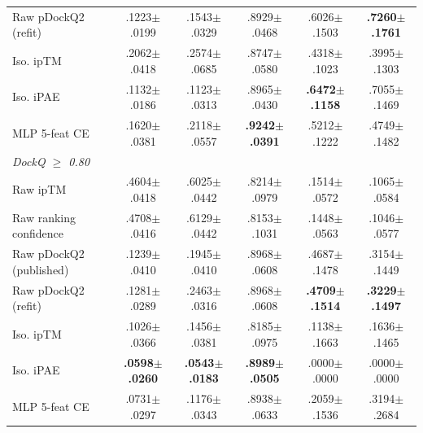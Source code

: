 \begin{table}[t]
{\begin{tabular}{lccccc}
Raw pDockQ2 (refit) & .1223$\pm$.0199 & .1543$\pm$.0329 & .8929$\pm$.0468 & .6026$\pm$.1503 & \textbf{.7260$\pm$.1761} \\
Iso. ipTM & .2062$\pm$.0418 & .2574$\pm$.0685 & .8747$\pm$.0580 & .4318$\pm$.1023 & .3995$\pm$.1303 \\
Iso. iPAE & .1132$\pm$.0186 & .1123$\pm$.0313 & .8965$\pm$.0430 & \textbf{.6472$\pm$.1158} & .7055$\pm$.1469 \\
MLP 5-feat CE & .1620$\pm$.0381 & .2118$\pm$.0557 & \textbf{.9242$\pm$.0391} & .5212$\pm$.1222 & .4749$\pm$.1482 \\
\midrule
\multicolumn{6}{l}{\textit{DockQ $\ge$ 0.80}} \\
Raw ipTM & .4604$\pm$.0418 & .6025$\pm$.0442 & .8214$\pm$.0979 & .1514$\pm$.0572 & .1065$\pm$.0584 \\
Raw ranking confidence & .4708$\pm$.0416 & .6129$\pm$.0442 & .8153$\pm$.1031 & .1448$\pm$.0563 & .1046$\pm$.0577 \\
Raw pDockQ2 (published) & .1239$\pm$.0410 & .1945$\pm$.0410 & .8968$\pm$.0608 & .4687$\pm$.1478 & .3154$\pm$.1449 \\
Raw pDockQ2 (refit) & .1281$\pm$.0289 & .2463$\pm$.0316 & .8968$\pm$.0608 & \textbf{.4709$\pm$.1514} & \textbf{.3229$\pm$.1497} \\
Iso. ipTM & .1026$\pm$.0366 & .1456$\pm$.0381 & .8185$\pm$.0975 & .1138$\pm$.1663 & .1636$\pm$.1465 \\
Iso. iPAE & \textbf{.0598$\pm$.0260} & \textbf{.0543$\pm$.0183} & \textbf{.8989$\pm$.0505} & .0000$\pm$.0000 & .0000$\pm$.0000 \\
MLP 5-feat CE & .0731$\pm$.0297 & .1176$\pm$.0343 & .8938$\pm$.0633 & .2059$\pm$.1536 & .3194$\pm$.2684 \\
\bottomrule
\end{tabular}
}%
\end{table}
